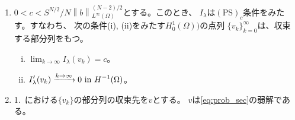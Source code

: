 \begin{lem} \label{lem:PS_c}
 \begin{enumerate}[1.] \sage
  \item  $0 < c < S^{N/2}/N\left\| b \right\|_{L^\infty(\Omega)}
         ^{(N-2)/2}$とする。このとき、
         $I_\lambda$は$(\mathrm{PS})_c$条件をみたす。すなわち、
         次の条件(i), (ii)をみたす$H_0^1(\Omega))$の点列
         $\{ v_k \}_{k = 0}^\infty$は、収束する部分列をもつ。
         \begin{enumerate}[(i)]
          \item $\displaystyle \lim_{k \to \infty} I_\lambda (v_k) = c$。
          \item $\displaystyle I^\prime_\lambda (v_k) \xrightarrow{k \to
                \infty} 0 ~\text{in}~ H^{-1}(\Omega)$。
         \end{enumerate}
  \item 1.~における$\{ v_k \}$の部分列の収束先を$v$とする。
        $v$は\ref{eq:prob_sec}の弱解である。
 \end{enumerate}
\end{lem}

